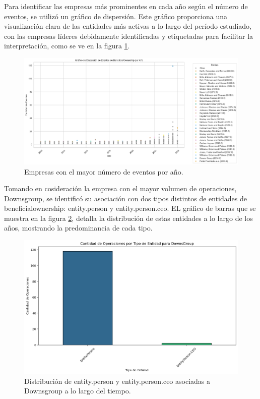\documentclass[11pt,spanish,a4paper]{article}
\begin{document}
Para identificar las empresas más prominentes en cada año según el número de eventos, se utilizó un gráfico de dispersión. Este gráfico proporciona una visualización clara de las entidades más activas a lo largo del período estudiado, con las empresas líderes debidamente identificadas y etiquetadas para facilitar la interpretación, como se ve en la figura \ref{fig:empresas_beneficial_ownership}.

\begin{figure}[H]
  \centering
  \includegraphics[width=0.7\linewidth]{graphs/dispersion_beneficialownership_top_anio.png}
  \caption{Empresas con el mayor número de eventos por año.}
  \label{fig:empresas_beneficial_ownership}
\end{figure}

Tomando en cosideración la empresa con el mayor volumen de operaciones, Downsgroup, se identificó su asociación con dos tipos distintos de entidades de beneficialownership: entity.person y entity.person.ceo. EL gráfico de barras que se muestra en la figura \ref{fig:downsgroup_ownership}, detalla la distribución de estas entidades a lo largo de los años, mostrando la predominancia de cada tipo.

\begin{figure}[H]
  \centering
  \includegraphics[width=0.7\linewidth]{graphs/distribuicion_beneficialownership_dowsgropup.png}
  \caption{Distribución de entity.person y entity.person.ceo asociadas a Downsgroup a lo largo del tiempo.}
  \label{fig:downsgroup_ownership}
\end{figure}
\end{document}
